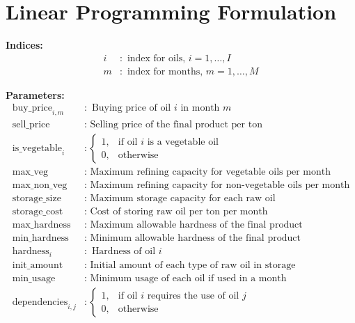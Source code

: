 \documentclass{article}
\begin{document}
\section*{Linear Programming Formulation}

\textbf{Indices:}
\begin{align*}
i & : \text{ index for oils, } i = 1, \ldots, I \\
m & : \text{ index for months, } m = 1, \ldots, M 
\end{align*}

\textbf{Parameters:}
\begin{align*}
\text{buy\_price}_{i,m} & : \text{ Buying price of oil } i \text{ in month } m \\
\text{sell\_price} & : \text{ Selling price of the final product per ton} \\
\text{is\_vegetable}_i & : \begin{cases} 
1, & \text{if oil } i \text{ is a vegetable oil} \\ 
0, & \text{otherwise} 
\end{cases} \\
\text{max\_veg} & : \text{ Maximum refining capacity for vegetable oils per month} \\
\text{max\_non\_veg} & : \text{ Maximum refining capacity for non-vegetable oils per month} \\
\text{storage\_size} & : \text{ Maximum storage capacity for each raw oil} \\
\text{storage\_cost} & : \text{ Cost of storing raw oil per ton per month} \\
\text{max\_hardness} & : \text{ Maximum allowable hardness of the final product} \\
\text{min\_hardness} & : \text{ Minimum allowable hardness of the final product} \\
\text{hardness}_i & : \text{ Hardness of oil } i \\
\text{init\_amount} & : \text{ Initial amount of each type of raw oil in storage} \\
\text{min\_usage} & : \text{ Minimum usage of each oil if used in a month} \\
\text{dependencies}_{i,j} & : \begin{cases} 
1, & \text{if oil } i \text{ requires the use of oil } j \\ 
0, & \text{otherwise} 
\end{cases} \\
\end{align*}
\end{document}
